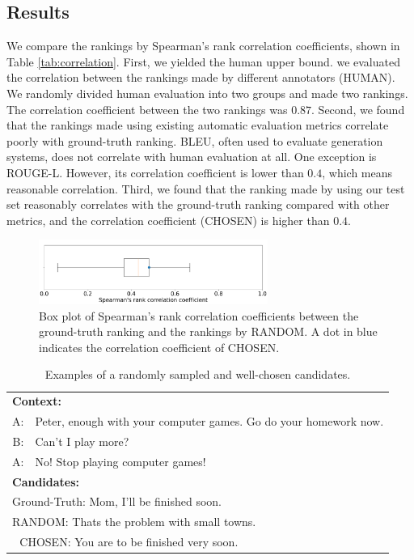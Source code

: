 \documentclass[11pt,a4paper]{article}
\begin{document}
\subsection{Results}
We compare the rankings by Spearman's rank correlation coefficients, shown in Table \ref{tab:correlation}.
First, we yielded the human upper bound.
we evaluated the correlation between the rankings made by different annotators (HUMAN).
We randomly divided human evaluation into two groups and made two rankings.
The correlation coefficient between the two rankings was $0.87$.
Second, we found that the rankings made using existing automatic evaluation metrics correlate poorly with ground-truth ranking.
BLEU, often used to evaluate generation systems, does not correlate with human evaluation at all.
One exception is ROUGE-L.
However, its correlation coefficient is lower than $0.4$, which means reasonable correlation.
Third, we found that the ranking made by using our test set reasonably correlates with the ground-truth ranking compared with other metrics, and the correlation coefficient (CHOSEN) is higher than $0.4$.

\begin{figure}[t]
\begin{center}
\includegraphics[width=75mm]{boxplot.png}
\end{center}
\caption{Box plot of Spearman's rank correlation coefficients between the ground-truth ranking and the rankings by RANDOM. A dot in blue indicates the correlation coefficient of CHOSEN.}
\label{fig:boxplot}
\end{figure}


\begin{table}[t]
    \centering
    \small
    \begin{tabular}{rp{40ex}}
        \toprule
        \multicolumn{2}{l}{\textbf{Context:}} \\
        A: & Peter, enough with your computer games. Go do your homework now.\\
        \rule{0pt}{2.5ex}
        B: & Can't I play more?   \\
        \rule{0pt}{2.5ex}
        A: & No! Stop playing computer games! \\
        \midrule
        \multicolumn{2}{l}{\textbf{Candidates:}} \\
        \multicolumn{2}{l}{Ground-Truth: Mom, I'll be finished soon.}  \\
        \multicolumn{2}{l}{\quad RANDOM: Thats the problem with small towns.} \\
        \multicolumn{2}{l}{\quad\,\, CHOSEN: You are to be finished very soon.} \\
        \bottomrule
    \end{tabular}
    \caption{Examples of a randomly sampled and well-chosen candidates.}
    \label{tab:comparisoncandidates}
\end{table}
\end{document}

